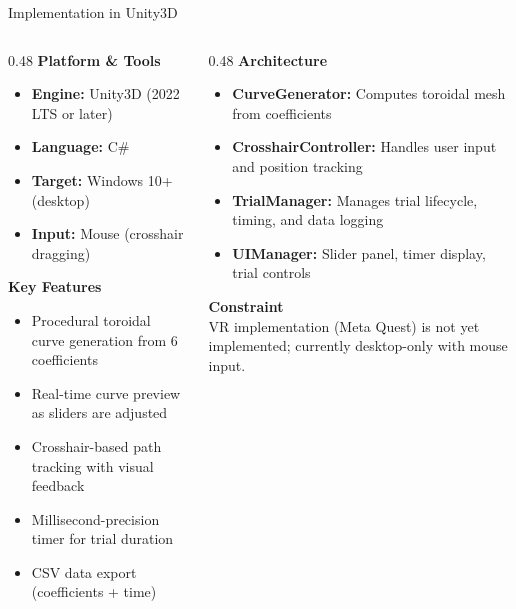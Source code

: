 \documentclass[aspectratio=169, 10pt]{beamer}
\begin{document}
\begin{frame}{Implementation in Unity3D}
  \begin{columns}[T]
    \begin{column}{0.48\textwidth}
      \textbf{Platform \& Tools}
      \begin{itemize}
        \item \textbf{Engine:} Unity3D (2022 LTS or later)
        \item \textbf{Language:} C\#
        \item \textbf{Target:} Windows 10+ (desktop)
        \item \textbf{Input:} Mouse (crosshair dragging)
      \end{itemize}

      \vspace{0.5em}
      \textbf{Key Features}
      \begin{itemize}
        \item Procedural toroidal curve generation from 6 coefficients
        \item Real-time curve preview as sliders are adjusted
        \item Crosshair-based path tracking with visual feedback
        \item Millisecond-precision timer for trial duration
        \item CSV data export (coefficients + time)
      \end{itemize}
    \end{column}
    \begin{column}{0.48\textwidth}
      \textbf{Architecture}
      \begin{itemize}
        \item \textbf{CurveGenerator:} Computes toroidal mesh from coefficients
        \item \textbf{CrosshairController:} Handles user input and position tracking
        \item \textbf{TrialManager:} Manages trial lifecycle, timing, and data logging
        \item \textbf{UIManager:} Slider panel, timer display, trial controls
      \end{itemize}

      \vspace{0.5em}
      \textbf{Constraint}\\
      VR implementation (Meta Quest) is \alert{not yet implemented}; currently desktop-only with mouse input.
    \end{column}
  \end{columns}
\end{frame}
\end{document}
